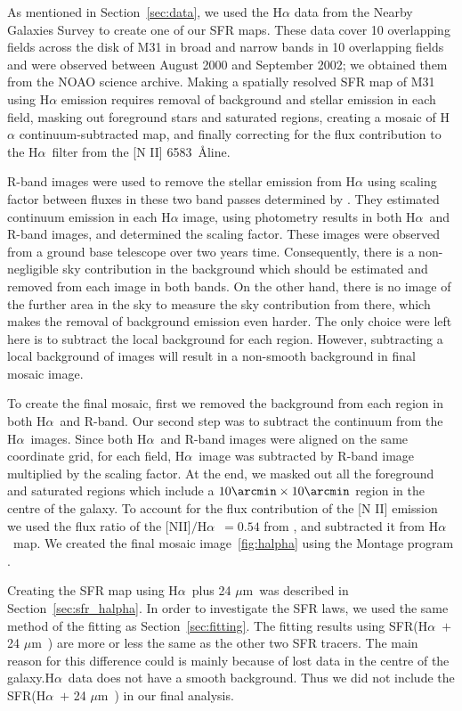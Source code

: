 \documentclass[useAMS,usenatbib]{mn2e}
\newcommand \halpha    {H$\alpha $\ }
\newcommand \um    {$\mu$m\ }
\begin{document}
As mentioned in Section~\ref{sec:data}, we used the H$\alpha$ data from the Nearby Galaxies Survey \citep{Massey07} to create one of our SFR maps. These data cover 10 overlapping fields across the disk of M31 in broad and narrow bands in 10 overlapping fields and were observed between August 2000 and September 2002; we obtained them  from the NOAO science archive. Making a spatially resolved SFR map of M31 using H$\alpha$ emission requires removal of background and stellar emission in each field, masking out foreground stars and saturated regions, creating a mosaic of H$\alpha$ continuum-subtracted map, and finally correcting for the flux contribution to the \halpha filter from the [N II] 6583~\AA line.

 R-band images were used to remove the stellar emission from H$\alpha$ using scaling factor between fluxes in these two band passes determined by \cite{Azimlu11}. They estimated continuum emission in each H$\alpha$ image, using photometry results in both \halpha and R-band images, and determined the scaling factor. These images were observed from a ground base telescope over two years time. Consequently, there is a non-negligible sky contribution in the background which should be estimated and removed from each image in both bands. On the other hand, there is no image of the further area in the sky to measure the sky contribution from there, which makes the removal of background emission even harder. The only choice were left here is to subtract the local background for each region. However, subtracting a local background of images will result in a non-smooth background in final mosaic image. 

To create the final mosaic, first we removed the background from each region in both \halpha and R-band. Our second step was to subtract the continuum from the \halpha images. Since both \halpha and R-band images were aligned on the same coordinate grid, for each field, \halpha image was subtracted by R-band image multiplied by the scaling factor. At the end, we masked out all the foreground and saturated regions which include a $10\arcmin \times 10\arcmin$ region in the centre of the galaxy. To account for the flux contribution of the [N II] emission we used the flux ratio of the [NII]$/$\halpha $= 0.54$ from \cite{Kennicutt08}, and subtracted it from \halpha map. We created the final mosaic image~\ref{fig:halpha} using the Montage program \citep{Berriman08}.

Creating the SFR map using \halpha plus 24 \um was described in Section~\ref{sec:sfr_halpha}. In order to investigate the SFR laws, we used the same method of the fitting as Section~\ref{sec:fitting}. The fitting results using SFR(\halpha $+$ 24 \um ) are more or less the same as the other two SFR tracers. The main reason for this difference could is mainly because of lost data in the centre of the galaxy.\halpha data does not have a smooth background. Thus we did not include the SFR(\halpha $+$ 24 \um ) in our final analysis.
\end{document}
